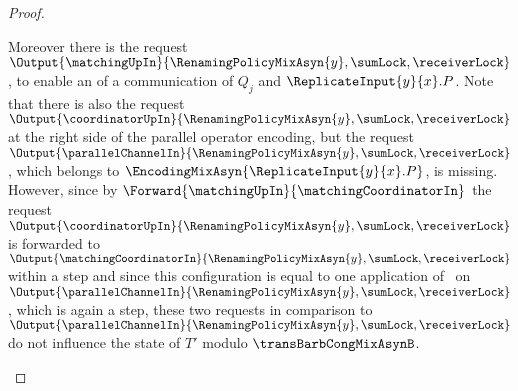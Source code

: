\documentclass[]{llncs}
\begin{document}
\begin{proof}
\begin{description}
\begin{description}
					Moreover there is the request $ \Output{\matchingUpIn}{\RenamingPolicyMixAsyn{y}, \sumLock, \receiverLock} $, to enable an \simulation of a communication of $ Q_j $ and $ \ReplicateInput{y}{x}.P $. Note that there is also the request $ \Output{\coordinatorUpIn}{\RenamingPolicyMixAsyn{y}, \sumLock, \receiverLock} $ at the right side of the parallel operator encoding, but the request $ \Output{\parallelChannelIn}{\RenamingPolicyMixAsyn{y}, \sumLock, \receiverLock} $, which belongs to $ \EncodingMixAsyn{\ReplicateInput{y}{x}.P} $, is missing. However, since by $ \Forward{\matchingUpIn}{\matchingCoordinatorIn} $ the request $ \Output{\coordinatorUpIn}{\RenamingPolicyMixAsyn{y}, \sumLock, \receiverLock} $ is forwarded to $ \Output{\matchingCoordinatorIn}{\RenamingPolicyMixAsyn{y}, \sumLock, \receiverLock} $ within a \pure \admin step and since this configuration is equal to one application of \processLeftInputRequests \ on $ \Output{\parallelChannelIn}{\RenamingPolicyMixAsyn{y}, \sumLock, \receiverLock} $, which is again a \pure \admin step, these two requests in comparison to $ \Output{\parallelChannelIn}{\RenamingPolicyMixAsyn{y}, \sumLock, \receiverLock} $ do not influence the state of $ T' $ modulo $ \transBarbCongMixAsynB $.
					

\end{description}
\end{description}
\end{proof}
\end{document}
